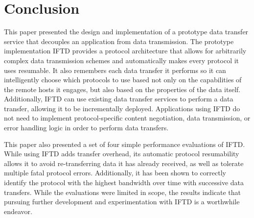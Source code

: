 \section{Conclusion}

This paper presented the design and implementation of a prototype data transfer service that decouples an application from data transmission.  The prototype implementation IFTD provides a protocol architecture that allows for arbitrarily complex data transmission schemes and automatically makes every protocol it uses resumable.  It also remembers each data transfer it performs so it can intelligently choose which protocols to use based not only on the capabilities of the remote hosts it engages, but also based on the properties of the data itself.  Additionally, IFTD can use existing data transfer services to perform a data transfer, allowing it to be incrementally deployed.  Applications using IFTD do not need to implement protocol-specific content negotiation, data transmission, or error handling logic in order to perform data transfers.

This paper also presented a set of four simple performance evaluations of IFTD.  While using IFTD adds transfer overhead, its automatic protocol resumability allows it to avoid re-transferring data it has already received, as well as tolerate multiple fatal protocol errors.  Additionally, it has been shown to correctly identify the protocol with the highest bandwidth over time with successive data transfers.  While the evaluations were limited in scope, the results indicate that pursuing further development and experimentation with IFTD is a worthwhile endeavor.
